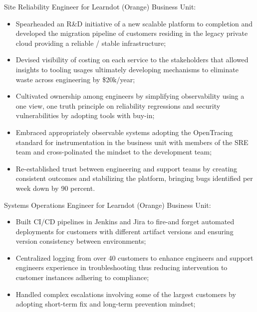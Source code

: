 \documentclass[11pt,a4paper,nolmodern,colorlinks=true,linkcolor=true]{moderncv}
\begin{document}
%
  {Site Reliability Engineer for Learndot (Orange) Business Unit:
    \begin{itemize}
      \item Spearheaded an R\&D initiative of a new scalable platform to completion and developed the migration pipeline of customers residing in the legacy private cloud providing a reliable / stable infrastructure;
      \item Devised visibility of costing on each service to the stakeholders that allowed insights to tooling usages ultimately developing mechanisms to eliminate waste across engineering by \$20k/year;
      \item Cultivated ownership among engineers by simplifying observability using a one view, one truth principle on reliability regressions and security vulnerabilities by adopting tools with buy-in;
      \item Embraced appropriately observable systems adopting the OpenTracing standard for instrumentation in the business unit with members of the SRE team and cross-polinated the mindset to the development team;
      \item Re-established trust between engineering and support teams by creating consistent outcomes and stabilizing the platform, bringing bugs identified per week down by 90 percent.
    \end{itemize}
}

\pagebreak

%
  {Systems Operations Engineer for Learndot (Orange) Business Unit:
    \begin{itemize}
      \item Built CI/CD pipelines in Jenkins and Jira to fire-and forget automated deployments for customers with different artifact versions and ensuring version consistency between environments;
      \item Centralized logging from over 40 customers to enhance engineers and support engineers experience in troubleshooting thus reducing intervention to customer instances adhering to compliance;
      \item Handled complex escalations involving some of the largest customers by adopting short-term fix and long-term prevention mindset;
    \end{itemize}
}
\end{document}
